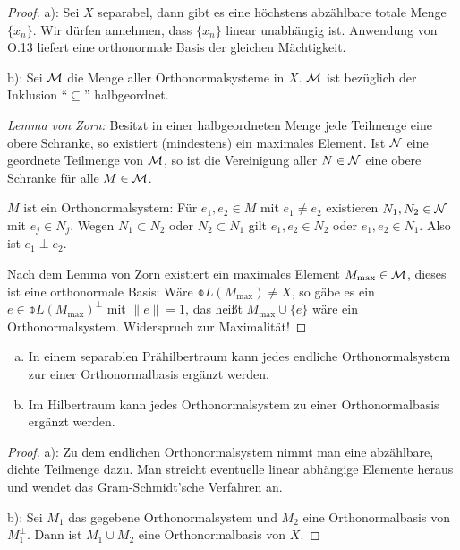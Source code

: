 \begin{proof}
  a): Sei $X$ separabel, dann gibt es eine höchstens abzählbare totale Menge
  $\{x_n\}$. Wir dürfen annehmen, dass $\{x_n\}$ linear unabhängig ist.
  Anwendung von O.13 liefert eine orthonormale Basis der gleichen Mächtigkeit.

  b): Sei $\mathcal{M}$ die Menge aller Orthonormalsysteme in $X$. $\mathcal{M}$ ist bezüglich
  der Inklusion ``$\subseteq$'' halbgeordnet.

  \emph{Lemma von Zorn:} Besitzt in einer halbgeordneten Menge jede Teilmenge
  eine obere Schranke, so existiert (mindestens) ein maximales Element. Ist
  $\mathcal{N}$ eine geordnete Teilmenge von $\mathcal{M}$, so ist die Vereinigung aller $N \in
  \mathcal{N}$ eine obere Schranke für alle $M \in \mathcal{M}$.

  $M$ ist ein Orthonormalsystem: Für $e_1, e_2 \in M$ mit $e_1 \ne e_2$
  existieren $N_1, N_2 \in \mathcal{N}$ mit $e_j \in N_j$. Wegen $N_1 \subset N_2$ oder
  $N_2 \subset N_1$ gilt $e_1, e_2 \in N_2$ oder $e_1, e_2 \in N_1$. Also ist
  $e_1 \perp e_2$.

  Nach dem Lemma von Zorn existiert ein maximales Element $M_{\max} \in \mathcal{M}$,
  dieses ist eine orthonormale Basis: Wäre $\obar{L(M_{\max})} \ne X$, so gäbe
  es ein $e \in \obar{L(M_{\max})}^\perp$ mit $\| e \| = 1$, das heißt $M_{\max}
  \cup \{e\}$ wäre ein Orthonormalsystem. Widerspruch zur Maximalität!
\end{proof}

\begin{folg} %
  \begin{enumerate}[a)]
  \item In einem separablen Prähilbertraum kann jedes endliche Orthonormalsystem
    zur einer Orthonormalbasis ergänzt werden.
  \item Im Hilbertraum kann jedes Orthonormalsystem zu einer Orthonormalbasis
    ergänzt werden.
  \end{enumerate}
\end{folg}

\begin{proof}
  a): Zu dem endlichen Orthonormalsystem nimmt man eine abzählbare, dichte
  Teilmenge dazu. Man streicht eventuelle linear abhängige Elemente heraus und
  wendet das Gram-Schmidt'sche Verfahren an.

  b): Sei $M_1$ das gegebene Orthonormalsystem und $M_2$ eine Orthonormalbasis
  von $M_1^\perp$. Dann ist $M_1 \cup M_2$ eine Orthonormalbasis von $X$.
\end{proof}


